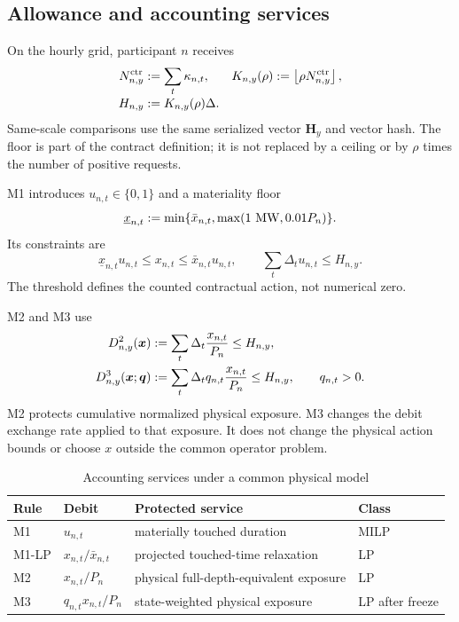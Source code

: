 \documentclass[10pt,journal]{IEEEtran}
\begin{document}
\subsection{Allowance and accounting services}

On the hourly grid, participant $n$ receives
\begin{align}
N_{n,y}^{\rm ctr}&:=\sum_t\kappa_{n,t},
&K_{n,y}(\rho)&:=\left\lfloor\rho N_{n,y}^{\rm ctr}\right\rfloor,
\notag\\[-1mm]
H_{n,y}&:=K_{n,y}(\rho)\Delta.
&&
\label{eq:allowance}
\end{align}
Same-scale comparisons use the same serialized vector $\bm H_y$ and vector hash. The floor is part of the contract definition; it is not replaced by a ceiling or by $\rho$ times the number of positive requests.

M1 introduces $u_{n,t}\in\{0,1\}$ and a materiality floor
\begin{equation}
\underline x_{n,t}:=
\min\{\bar x_{n,t},\max(1\ {\rm MW},0.01P_n)\}.
\label{eq:floor}
\end{equation}
Its constraints are
\begin{equation}
\underline x_{n,t}u_{n,t}\leq x_{n,t}
\leq\bar x_{n,t}u_{n,t},
\qquad
\sum_t\Delta_tu_{n,t}\leq H_{n,y}.
\label{eq:m1}
\end{equation}
The threshold defines the counted contractual action, not numerical zero.

M2 and M3 use
\begin{align}
D_{n,y}^{2}(\bm x)
&:=\sum_t\Delta_t\frac{x_{n,t}}{P_n}\leq H_{n,y},
\notag\\
D_{n,y}^{3}(\bm x;\bm q)
&:=\sum_t\Delta_tq_{n,t}\frac{x_{n,t}}{P_n}\leq H_{n,y},
\qquad q_{n,t}>0.
\label{eq:m2m3}
\end{align}
M2 protects cumulative normalized physical exposure. M3 changes the debit exchange rate applied to that exposure. It does not change the physical action bounds or choose $x$ outside the common operator problem.

\begin{table}[t]
\caption{Accounting services under a common physical model}
\label{tab:rules}
\centering
\footnotesize
\begin{tabularx}{\columnwidth}{@{}lXXX@{}}
\toprule
Rule & Debit & Protected service & Class \\
\midrule
M1 & $u_{n,t}$ & materially touched duration & MILP \\
M1-LP & $x_{n,t}/\bar x_{n,t}$ & projected touched-time relaxation & LP \\
M2 & $x_{n,t}/P_n$ & physical full-depth-equivalent exposure & LP \\
M3 & $q_{n,t}x_{n,t}/P_n$ & state-weighted physical exposure & LP after freeze \\
\bottomrule
\end{tabularx}
\end{table}
\end{document}
